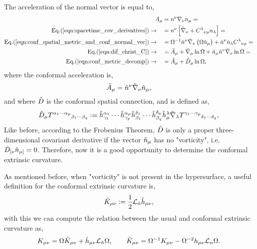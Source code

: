 The acceleration of the normal vector is equal to,
\begin{align}
    A_\mu &= n^\nu \nabla_\nu n_\mu =\nonumber\\
    \text{Eq.(\ref{eqn:spacetime_cov_derivatives})}\rightarrow \quad &= n^\nu \left[\Tilde{\nabla}_\nu + C^\lambda{}_{\nu\mu}n_\lambda\right]=\nonumber\\
    \text{Eq.(\ref{eqn:conf_spatial_metric_and_conf_normal_vec})}\rightarrow \quad &= \Omega^{-1}\Tilde{n}^\nu \Tilde{\nabla}_\nu\left(\Omega \Tilde{n}_\mu\right)+\Tilde{n}^\nu \Tilde{n}_\lambda C^\lambda{}_{\nu\mu}=\nonumber\\
    \text{Eq.(\ref{eqn:dif_christ_C})}\rightarrow \quad &= \Tilde{A}_\mu + \Tilde{\nabla}_\mu \ln\Omega + \Tilde{n}_\mu \Tilde{n}^\nu \Tilde{\nabla}_\nu\ln\Omega=\nonumber\\
    \text{Eq.(\ref{eqn:conf_metric_decomp})}\rightarrow \quad &= \Tilde{A}_\mu + \Tilde{D}_\mu \ln\Omega,
    \label{eqn:conf_acceleration}
\end{align}
where the conformal acceleration is,
\begin{equation}
    \Tilde{A}_\mu = \Tilde{n}^\nu \Tilde{\nabla}_\nu \Tilde{n}_\mu,
\end{equation}
and where $\Tilde{D}$ is the conformal spatial connection, and is defined as,
\begin{equation}
    \Tilde{D}_\mu T^{\alpha_1\cdots \alpha_p}{}_{\beta_1\cdots\beta_q} := \Tilde{h}^{\alpha_1}_{\gamma_1}\cdots \Tilde{h}^{\alpha_p}_{\gamma_p} \Tilde{h}^{\delta_1}_{\beta_1}\cdots\Tilde{h}^{\delta_q}_{\beta_q}\Tilde{h}^{\lambda}_{\mu}\Tilde{\nabla}_\lambda T^{\gamma_1\cdots \gamma_p}{}_{\delta_1\cdots\delta_q},
    \label{eqn:conf_spatial_der}
\end{equation}
Like before, according to the Frobenius Theorem, $\Tilde{D}$ is only a proper three-dimensional covariant derivative if the vector $\Tilde{n}_\mu$ has no "vorticity", i.e. $\Tilde{D}_{[\nu} \Tilde{n}_{\mu]}=0$. Therefore, now it is a good opportunity to determine the conformal extrinsic curvature.

As mentioned before, when "vorticity" is not present in the hypersurface, a useful definition for the conformal extrinsic curvature is,
\begin{equation}
    \Tilde{K}_{\mu\nu}:=\frac{1}{2}\mathcal{L}_{\Tilde{n}} \Tilde{h}_{\mu\nu},
\end{equation}
with this we can compute the relation between the usual and conformal extrinsic curvature as,
\begin{equation}
    K_{\mu\nu}=\Omega\Tilde{K}_{\mu\nu}+\Tilde{h}_{\mu\nu}\mathcal{L}_{\Tilde{n}}\Omega, \qquad \Tilde{K}_{\mu\nu}=\Omega^{-1}K_{\mu\nu}-\Omega^{-2}h_{\mu\nu}\mathcal{L}_n\Omega.
\end{equation}

